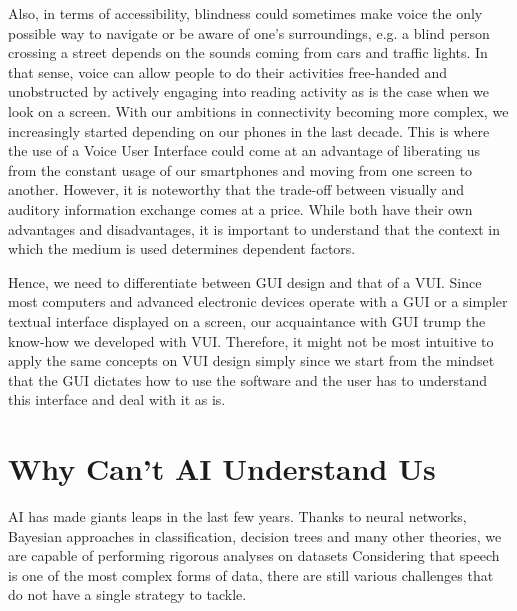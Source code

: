 Also, in terms of accessibility, blindness could sometimes make voice the only possible way to navigate or be aware of one's surroundings, e.g. a blind person crossing a street depends on the sounds coming from cars and traffic lights.
In that sense, voice can allow people to do their activities free-handed and unobstructed by actively engaging into reading activity %
as is the case when we look on a screen.
With our ambitions in connectivity becoming more complex, we %
increasingly started depending on our phones in the last decade.
This is where the use of a Voice User Interface could come at an advantage of liberating us from the constant usage of our smartphones and moving from one screen to another. 
However, it is noteworthy that the trade-off between visually and auditory information exchange comes at a price. While both have their own advantages and disadvantages, it is important to understand that the context in which the medium is used determines dependent factors.

Hence, we need to differentiate between GUI design and that of a VUI. Since most computers and advanced electronic devices operate with a GUI or a simpler textual interface displayed on a screen, our acquaintance with GUI trump the know-how we developed with VUI. %
Therefore, it might not be most intuitive to apply the same concepts on VUI design simply since we start from the mindset that the GUI dictates how to use the software and the user has to understand this interface and deal with it as is.







\section{Why Can't AI Understand Us}

AI has made giants leaps in the last few years. Thanks to neural networks, Bayesian approaches in classification, decision trees and many other theories, we are capable of performing rigorous analyses on datasets
Considering that speech is one of the most complex forms of data, there are still various challenges that do not have a single strategy to tackle.

